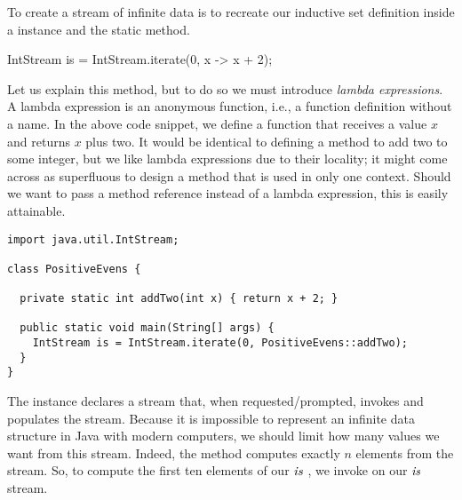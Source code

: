 To create a stream of infinite data is to recreate our inductive set definition inside a  instance and the  static method.

\begin{verbnobox}[\small]
IntStream is = IntStream.iterate(0, x -> x + 2);
\end{verbnobox}

Let us explain this method, but to do so we must introduce \emph{lambda expressions}. A lambda expression is an anonymous function, i.e., a function definition without a name. In the above code snippet, we define a function that receives a value $x$ and returns $x$ plus two. It would be identical to defining a  method to add two to some integer, but we like lambda expressions due to their locality; it might come across as superfluous to design a method that is used in only one context. Should we want to pass a method reference instead of a lambda expression, this is easily attainable.
\begin{cl}[]{}
\begin{lstlisting}[language=MyJava]
import java.util.IntStream;

class PositiveEvens {

  private static int addTwo(int x) { return x + 2; }

  public static void main(String[] args) {
    IntStream is = IntStream.iterate(0, PositiveEvens::addTwo);
  }
}   
\end{lstlisting}
\end{cl}

The  instance declares a stream that, when requested/prompted, invokes and populates the stream. Because it is impossible to represent an infinite data structure in Java with modern computers, we should limit how many values we want from this stream. Indeed, the  method computes exactly $n$ elements from the stream. So, to compute the first ten elements of our $\emph{is}$ , we invoke  on our $\emph{is}$ stream. 

